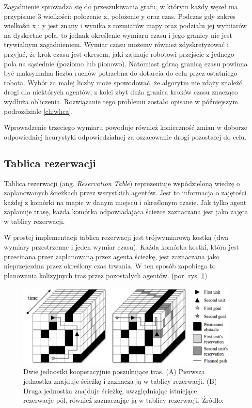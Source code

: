Zagadnienie sprowadza się do przeszukiwania grafu, w którym każdy węzeł ma przypisane 3 wielkości: położenie x, położenie y oraz czas.
Podczas gdy zakres wielkości x i y jest znany i wynika z rozmiarów mapy oraz podziału jej wymiarów na dyskretne pola, to jednak określenie wymiaru czasu i jego granicy nie jest trywialnym zagadnieniem.
Wymiar czasu możemy również zdyskretyzować i przyjać, że krok czasu jest okresem, jaki zajmuje robotowi przejście z jednego pola na sąsiednie (poziomo lub pionowo). Natomiast górną granicą czasu powinna być maksymalna liczba ruchów potrzebna do dotarcia do celu przez ostatniego robota. Wybór za małej liczby może spowodować, że algorytm nie zdąży znaleźć drogi dla niektórych agentów, z kolei zbyt duża granica kroków czasu znacząco wydłuża obliczenia. Rozwiązanie tego problemu zostało opisane w późniejszym podrozdziale \ref{ch:whca}.

Wprowadzenie trzeciego wymiaru powoduje również konieczność zmian w doborze odpowiedniej heurystyki odpowiedzialnej za oszacowanie drogi pozostałej do celu.

\subsection{Tablica rezerwacji}
Tablica rezerwacji (ang. {\it Reservation Table}) reprezentuje wspódzieloną wiedzę o zaplanowanych ścieżkach przez wszystkich agentów.
Jest to informacja o zajętości każdej z komórki na mapie w danym miejscu i określonym czasie. \cite{cooppath}
Jak tylko agent zaplanuje trasę, każda komórka odpowiadająca ścieżce zaznaczana jest jako zajęta w tablicy rezerwacji.

W prostej implementacji tablica rezerwacji jest trójwymiarową kostką (dwa wymiary przestrzenne i jeden wymiar czasu).
Każda komórka kostki, która jest przecinana przez zaplanowaną przez agenta ścieżkę, jest zaznaczana jako nieprzejezdna przez określony czas trwania. W ten sposób zapobiega to planowania kolizyjnych tras przez pozostałych agentów. (por. rys. \ref{fig:img_reservation-table})

\begin{figure}
	\centering
	\includegraphics[width=13cm]{img/reservation-table}
	\caption{Dwie jednostki kooperacyjnie poszukujące tras. (A) Pierwsza jednostka znajduje ścieżkę i zaznacza ją w tablicy rezerwacji. (B) Druga jednostka znajduje ścieżkę, uwzględniając istniejące rezerwacje pól, również zaznaczając ją w tablicy rezerwacji. Źródło: \cite{cooppath}}
	\label{fig:img_reservation-table}
\end{figure}

